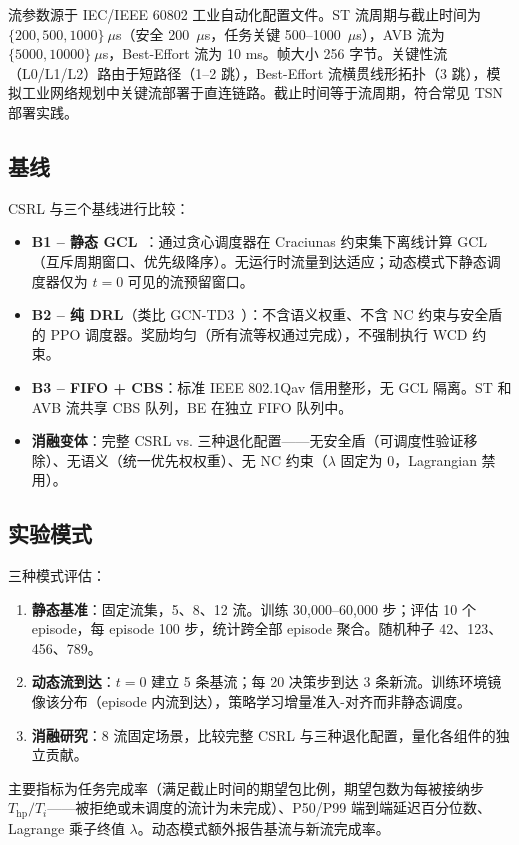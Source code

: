 \documentclass[UTF8]{ctexart}
\begin{document}
流参数源于 IEC/IEEE 60802 工业自动化配置文件。ST 流周期与截止时间为 $\{200, 500, 1000\}~\mu$s（安全 200~$\mu$s，任务关键 500--1000~$\mu$s），AVB 流为 $\{5000, 10000\}~\mu$s，Best-Effort 流为 10 ms。帧大小 256 字节。关键性流（L0/L1/L2）路由于短路径（1--2 跳），Best-Effort 流横贯线形拓扑（3 跳），模拟工业网络规划中关键流部署于直连链路。截止时间等于流周期，符合常见 TSN 部署实践。

\subsection{基线}

CSRL 与三个基线进行比较：
\begin{itemize}
\item \textbf{B1 -- 静态 GCL}~\cite{craciunas2016smt}：通过贪心调度器在 Craciunas 约束集下离线计算 GCL（互斥周期窗口、优先级降序）。无运行时流量到达适应；动态模式下静态调度器仅为 $t=0$ 可见的流预留窗口。
\item \textbf{B2 -- 纯 DRL}（类比 GCN-TD3~\cite{islam2024gcntd3}）：不含语义权重、不含 NC 约束与安全盾的 PPO 调度器。奖励均匀（所有流等权通过完成），不强制执行 WCD 约束。
\item \textbf{B3 -- FIFO + CBS}：标准 IEEE 802.1Qav 信用整形，无 GCL 隔离。ST 和 AVB 流共享 CBS 队列，BE 在独立 FIFO 队列中。
\item \textbf{消融变体}：完整 CSRL vs. 三种退化配置——无安全盾（可调度性验证移除）、无语义（统一优先权权重）、无 NC 约束（$\lambda$ 固定为 0，Lagrangian 禁用）。
\end{itemize}

\subsection{实验模式}

三种模式评估：
\begin{enumerate}
\item \textbf{静态基准}：固定流集，5、8、12 流。训练 30,000--60,000 步；评估 10 个 episode，每 episode 100 步，统计跨全部 episode 聚合。随机种子 42、123、456、789。
\item \textbf{动态流到达}：$t=0$ 建立 5 条基流；每 20 决策步到达 3 条新流。训练环境镜像该分布（episode 内流到达），策略学习增量准入-对齐而非静态调度。
\item \textbf{消融研究}：8 流固定场景，比较完整 CSRL 与三种退化配置，量化各组件的独立贡献。
\end{enumerate}

主要指标为任务完成率（满足截止时间的期望包比例，期望包数为每被接纳步 $T_{\text{hp}}/T_i$——被拒绝或未调度的流计为未完成）、P50/P99 端到端延迟百分位数、Lagrange 乘子终值 $\lambda$。动态模式额外报告基流与新流完成率。
\end{document}
